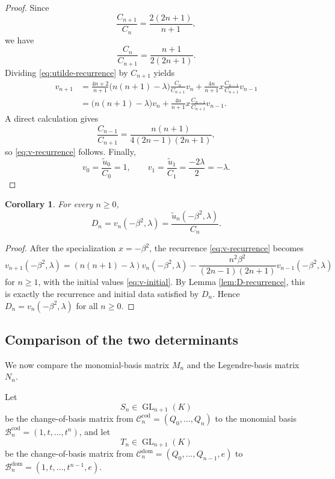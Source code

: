 \documentclass[11pt,letterpaper]{amsart}
\numberwithin{equation}{section}
\theoremstyle{plain}
\newtheorem{corollary}[theorem]{Corollary}
\theoremstyle{remark}
\begin{document}
\begin{proof}
Since
\[
 \frac{C_{n+1}}{C_n}=\frac{2(2n+1)}{n+1},
\]
we have
\[
 \frac{C_n}{C_{n+1}}=\frac{n+1}{2(2n+1)}.
\]
Dividing \eqref{eq:utilde-recurrence} by $C_{n+1}$ yields
\begin{align*}
 v_{n+1}
 &=\frac{4n+2}{n+1}\bigl(n(n+1)-\lambda\bigr)\frac{C_n}{C_{n+1}}v_n
 +\frac{4n}{n+1}x\frac{C_{n-1}}{C_{n+1}}v_{n-1} \\
 &=\bigl(n(n+1)-\lambda\bigr)v_n
 +\frac{4n}{n+1}x\frac{C_{n-1}}{C_{n+1}}v_{n-1}.
\end{align*}
A direct calculation gives
\[
 \frac{C_{n-1}}{C_{n+1}}=
 \frac{n(n+1)}{4(2n-1)(2n+1)},
\]
so \eqref{eq:v-recurrence} follows. Finally,
\[
 v_0=\frac{\widetilde u_0}{C_0}=1,
 \qquad
 v_1=\frac{\widetilde u_1}{C_1}=\frac{-2\lambda}{2}=-\lambda.
\]
\end{proof}

\begin{corollary}\label{cor:D=v}
For every $n\ge 0$,
\begin{equation}\label{eq:D-equals-v}
 D_n=v_n(-\beta^2,\lambda)=\frac{\widetilde u_n(-\beta^2,\lambda)}{C_n}.
\end{equation}
\end{corollary}

\begin{proof}
After the specialization $x=-\beta^2$, the recurrence \eqref{eq:v-recurrence} becomes
\[
 v_{n+1}(-\beta^2,\lambda)
 =(n(n+1)-\lambda)v_n(-\beta^2,\lambda)
 -\frac{n^2\beta^2}{(2n-1)(2n+1)}v_{n-1}(-\beta^2,\lambda)
\]
for $n\ge 1$, with the initial values \eqref{eq:v-initial}. By Lemma \ref{lem:D-recurrence}, this is exactly the recurrence and initial data satisfied by $D_n$. Hence $D_n=v_n(-\beta^2,\lambda)$ for all $n\ge 0$.
\end{proof}

\subsection{Comparison of the two determinants}

We now compare the monomial-basis matrix $M_n$ and the Legendre-basis matrix $N_n$.

Let
\[
 S_n\in \operatorname{GL}_{n+1}(K)
\]
be the change-of-basis matrix from $\mathcal C_n^{\mathrm{cod}}=(Q_0,\dots,Q_n)$ to the monomial basis $\mathcal B_n^{\mathrm{cod}}=(1,t,\dots,t^n)$, and let
\[
 T_n\in \operatorname{GL}_{n+1}(K)
\]
be the change-of-basis matrix from $\mathcal C_n^{\mathrm{dom}}=(Q_0,\dots,Q_{n-1},e)$ to $\mathcal B_n^{\mathrm{dom}}=(1,t,\dots,t^{n-1},e)$.
\end{document}
